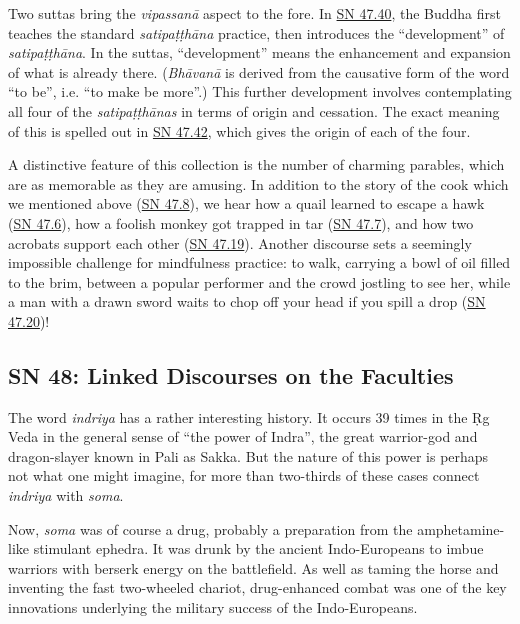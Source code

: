 \documentclass[12pt,openany]{book}%
\begin{document}
Two suttas bring the \textit{\textsanskrit{vipassanā}} aspect to the fore. In \href{https://suttacentral.net/sn47.40}{SN 47.40}, the Buddha first teaches the standard \textit{\textsanskrit{satipaṭṭhāna}} practice, then introduces the “development” of \textit{\textsanskrit{satipaṭṭhāna}}. In the suttas, “development” means the enhancement and expansion of what is already there. (\textit{\textsanskrit{Bhāvanā}} is derived from the causative form of the word “to be”, i.e. “to make be more”.) This further development involves contemplating all four of the \textit{\textsanskrit{satipaṭṭhānas}} in terms of origin and cessation. The exact meaning of this is spelled out in \href{https://suttacentral.net/sn47.42}{SN 47.42}, which gives the origin of each of the four.

A distinctive feature of this collection is the number of charming parables, which are as memorable as they are amusing. In addition to the story of the cook which we mentioned above (\href{https://suttacentral.net/sn47.8}{SN 47.8}), we hear how a quail learned to escape a hawk (\href{https://suttacentral.net/sn47.6}{SN 47.6}), how a foolish monkey got trapped in tar (\href{https://suttacentral.net/sn47.7}{SN 47.7}), and how two acrobats support each other (\href{https://suttacentral.net/sn47.19}{SN 47.19}). Another discourse sets a seemingly impossible challenge for mindfulness practice: to walk, carrying a bowl of oil filled to the brim, between a popular performer and the crowd jostling to see her, while a man with a drawn sword waits to chop off your head if you spill a drop (\href{https://suttacentral.net/sn47.20}{SN 47.20})!

\subsection*{SN 48: Linked Discourses on the Faculties}

The word \textit{indriya} has a rather interesting history. It occurs 39 times in the Ṛg Veda in the general sense of “the power of Indra”, the great warrior-god and dragon-slayer known in Pali as Sakka. But the nature of this power is perhaps not what one might imagine, for more than two-thirds of these cases connect \textit{indriya} with \textit{soma}.

Now, \textit{soma} was of course a drug, probably a preparation from the amphetamine-like stimulant ephedra. It was drunk by the ancient Indo-Europeans to imbue warriors with berserk energy on the battlefield. As well as taming the horse and inventing the fast two-wheeled chariot, drug-enhanced combat was one of the key innovations underlying the military success of the Indo-Europeans.
\end{document}
